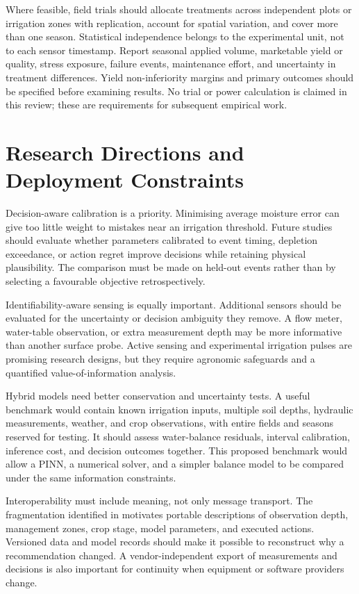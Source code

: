 \documentclass[11pt,a4paper]{article}
\begin{document}
Where feasible, field trials should allocate treatments across independent plots or irrigation zones with replication, account for spatial variation, and cover more than one season. Statistical independence belongs to the experimental unit, not to each sensor timestamp. Report seasonal applied volume, marketable yield or quality, stress exposure, failure events, maintenance effort, and uncertainty in treatment differences. Yield non-inferiority margins and primary outcomes should be specified before examining results. No trial or power calculation is claimed in this review; these are requirements for subsequent empirical work.

\section{Research Directions and Deployment Constraints}

\label{sec:9}

Decision-aware calibration is a priority. Minimising average moisture error can give too little weight to mistakes near an irrigation threshold. Future studies should evaluate whether parameters calibrated to event timing, depletion exceedance, or action regret improve decisions while retaining physical plausibility. The comparison must be made on held-out events rather than by selecting a favourable objective retrospectively.

Identifiability-aware sensing is equally important. Additional sensors should be evaluated for the uncertainty or decision ambiguity they remove. A flow meter, water-table observation, or extra measurement depth may be more informative than another surface probe. Active sensing and experimental irrigation pulses are promising research designs, but they require agronomic safeguards and a quantified value-of-information analysis.

Hybrid models need better conservation and uncertainty tests. A useful benchmark would contain known irrigation inputs, multiple soil depths, hydraulic measurements, weather, and crop observations, with entire fields and seasons reserved for testing. It should assess water-balance residuals, interval calibration, inference cost, and decision outcomes together. This proposed benchmark would allow a PINN, a numerical solver, and a simpler balance model to be compared under the same information constraints.

Interoperability must include meaning, not only message transport. The fragmentation identified in \cite{R04} motivates portable descriptions of observation depth, management zones, crop stage, model parameters, and executed actions. Versioned data and model records should make it possible to reconstruct why a recommendation changed. A vendor-independent export of measurements and decisions is also important for continuity when equipment or software providers change.
\end{document}
